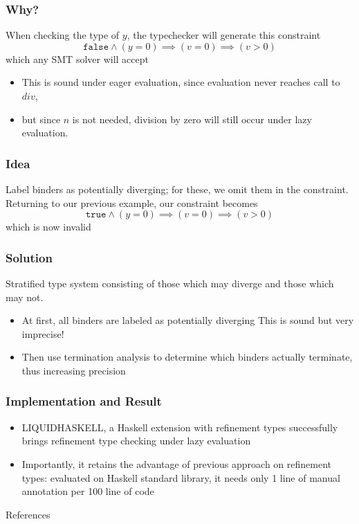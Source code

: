 \documentclass[pdf]{beamer}
\begin{document}
\begin{frame}
  \frametitle{Why?}
  When checking the type of $y$, the typechecker will generate this constraint
  $$\mathtt{false}\wedge(y=0)\implies(v=0)\implies(v>0)$$
  which any SMT solver will accept
  \begin{itemize}
    \item This is sound under eager evaluation, since evaluation never reaches call to $div$,
    \item but since $n$ is not needed, division by zero will still occur under lazy evaluation.
  \end{itemize}
\end{frame}

\begin{frame}
  \frametitle{Idea}
  Label binders as potentially diverging; for these, we omit them in the
  constraint.  Returning to our previous example, our constraint becomes
  $$\mathtt{true}\wedge(y=0)\implies(v=0)\implies(v>0)$$
  which is now invalid
\end{frame}

\begin{frame}
  \frametitle{Solution}
  Stratified type system consisting of those which may diverge and those which
  may not.
  \begin{itemize}
    \item At first, all binders are labeled as potentially diverging  This is
      sound but very imprecise!
    \item Then use termination analysis to determine which binders actually
      terminate, thus increasing precision
  \end{itemize}
\end{frame}


\begin{frame}
  \frametitle{Implementation and Result}
  \begin{itemize}
    \item LIQUIDHASKELL, a Haskell extension with refinement types successfully
      brings refinement type checking under lazy evaluation  
    \item Importantly, it retains the advantage of previous approach on
      refinement types: evaluated on Haskell standard library, it needs only 1
      line of manual annotation per 100 line of code
  \end{itemize}
\end{frame}

\begin{frame}{References}
  
  
  \nocite{Rondon:2008:LT,Xi:1998:EAB,DBLP:conf/focs/HopcroftPV75}
\end{frame}
\end{document}
